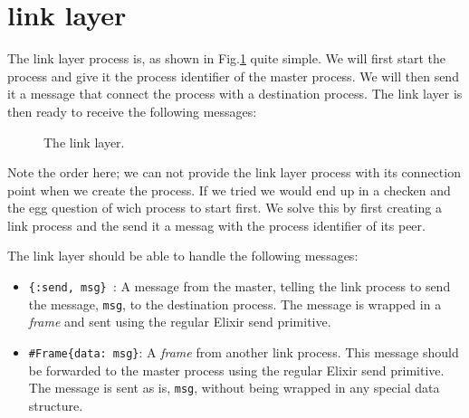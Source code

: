 \documentclass[a4paper,11pt]{article}
\begin{document}
\section{link layer}

The link layer process is, as shown in Fig.\ref{fig:link} quite
simple. We will first start the process and give it the process
identifier of the master process. We will then send it a message that
connect the process with a destination process. The link layer is then
ready to receive the following messages:

\begin{figure}
\centering  
{}

\caption{The link layer.}
\label{fig:link}

\end{figure}

Note the order here; we can not provide the link layer process with
its connection point when we create the process. If we tried we would
end up in a checken and the egg question of wich process to start
first. We solve this by first creating a link process and the send it
a messag with the process identifier of its peer.

The link layer should be able to handle the following messages:

\begin{itemize}

  \item {\tt \{:send, msg\} }: A message from the master, telling the link
    process to send the message, {\tt msg}, to the destination process. The
    message is wrapped in a {\em frame} and sent using the
    regular Elixir send primitive.

  \item {\tt \#Frame\{data: msg\}}: A {\em frame} from another link
    process. This message should be forwarded to the master process
    using the regular Elixir send primitive. The message is sent as
    is, {\tt msg}, without being wrapped in any special data structure.
\end{itemize}
\end{document}
